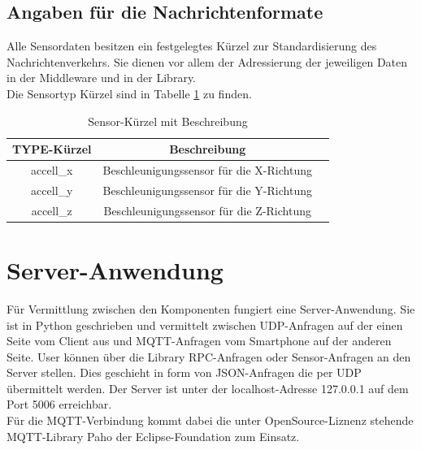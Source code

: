 \documentclass[11pt,a4paper]{report}
\begin{document}
\subsection{Angaben für die Nachrichtenformate}
Alle Sensordaten besitzen ein festgelegtes Kürzel zur Standardisierung des Nachrichtenverkehrs.
Sie dienen vor allem der Adressierung der jeweiligen Daten in der Middleware und in der Library.
\\
Die Sensortyp Kürzel sind in Tabelle \ref{tab:sensor_types} zu finden. 
\begin{table}[htbp]
  \centering
  \begin{tabular}{|c|c|c}
      \hline
      TYPE-Kürzel & Beschreibung \\
      \hline
      accell\_x & Beschleunigungssensor für die X-Richtung \\
      \hline
      accell\_y & Beschleunigungssensor für die Y-Richtung \\
      \hline
      accell\_z & Beschleunigungssensor für die Z-Richtung \\
      \hline

  \end{tabular}
  \caption{Sensor-Kürzel mit Beschreibung}
  \label{tab:sensor_types}
\end{table}

\section{Server-Anwendung}

Für Vermittlung zwischen den Komponenten fungiert eine Server-Anwendung.
Sie ist in Python geschrieben und vermittelt zwischen UDP-Anfragen auf der einen Seite vom Client aus und MQTT-Anfragen vom Smartphone auf der anderen Seite.
User können über die Library RPC-Anfragen oder Sensor-Anfragen an den Server stellen.
Dies geschieht in form von JSON-Anfragen die per UDP übermittelt werden.
Der Server ist unter der localhost-Adresse 127.0.0.1 auf dem Port 5006 erreichbar.
\\
Für die MQTT-Verbindung kommt dabei die unter OpenSource-Liznenz stehende MQTT-Library Paho der Eclipse-Foundation zum Einsatz. \cite{paho}
\end{document}
